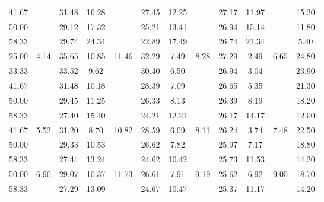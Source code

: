 \begin{table}
\begin{tabular}{cccccccccccc}
		41.67	&&31.48	&16.28	&&27.45	&12.25	&&27.17	&11.97	&&15.20\\
		50.00	&&29.12	&17.32	&&25.21	&13.41	&&26.94	&15.14	&&11.80\\
		58.33	&&29.74	&24.34	&&22.89	&17.49	&&26.74	&21.34	&&5.40\\
		\midrule
		25.00	&\multirow{5}{*}{4.14}	&35.65	&10.85	&\multirow{5}{*}{11.46}	&32.29	&7.49	&\multirow{5}{*}{8.28}	&27.29	&2.49	&\multirow{5}{*}{6.65}	&24.80\\
		33.33	&&33.52	&9.62	&&30.40	&6.50	&&26.94	&3.04	&&23.90\\
		41.67	&&31.48	&10.18	&&28.39	&7.09	&&26.65	&5.35	&&21.30\\
		50.00	&&29.45	&11.25	&&26.33	&8.13	&&26.39	&8.19	&&18.20\\
		58.33	&&27.40	&15.40	&&24.21	&12.21	&&26.17	&14.17	&&12.00\\
		\midrule
		41.67	&\multirow{3}{*}{5.52}	&31.20	&8.70	&\multirow{3}{*}{10.82}	&28.59	&6.09	&\multirow{3}{*}{8.11}	&26.24	&3.74	&\multirow{3}{*}{7.48}	&22.50\\
		50.00	&&29.33	&10.53	&&26.62	&7.82	&&25.97	&7.17	&&18.80\\
		58.33	&&27.44	&13.24	&&24.62	&10.42	&&25.73	&11.53	&&14.20\\
		\midrule
		50.00	&\multirow{2}{*}{6.90}	&29.07	&10.37	&\multirow{2}{*}{11.73}	&26.61	&7.91	&\multirow{2}{*}{9.19}	&25.62	&6.92	&\multirow{2}{*}{9.05}		&18.70\\
		58.33	&&27.29	&13.09	&&24.67	&10.47	&&25.37	&11.17	&&14.20\\
		\bottomrule
	\end{tabular}
	\label{tab:EfficiencyComparison}
\end{table}

